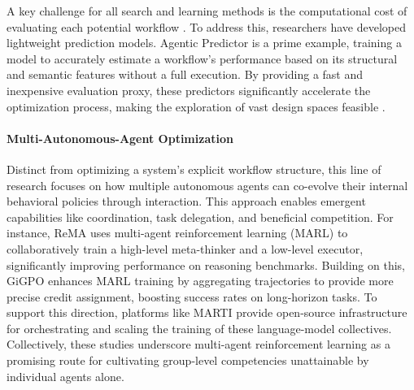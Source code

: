 A key challenge for all search and learning methods is the computational cost of evaluating each potential workflow \citep{shang2025agentsquare}. To address this, researchers have developed lightweight prediction models. Agentic Predictor \citep{trirat2025agentic} is a prime example, training a model to accurately estimate a workflow's performance based on its structural and semantic features without a full execution. By providing a fast and inexpensive evaluation proxy, these predictors significantly accelerate the optimization process, making the exploration of vast design spaces feasible \citep{zhang2025gnns}.


\paragraph{Multi-Autonomous-Agent Optimization}
Distinct from optimizing a system's explicit workflow structure, this line of research focuses on how multiple autonomous agents can co-evolve their internal behavioral policies through interaction. This approach enables emergent capabilities like coordination, task delegation, and beneficial competition. For instance, ReMA \citep{wan2025remalearningmetathinkllms} uses multi-agent reinforcement learning (MARL) to collaboratively train a high-level meta-thinker and a low-level executor, significantly improving performance on reasoning benchmarks. Building on this, GiGPO \citep{feng2025groupingrouppolicyoptimizationllm} enhances MARL training by aggregating trajectories to provide more precise credit assignment, boosting success rates on long-horizon tasks. To support this direction, platforms like MARTI \citep{liao2025marftmultiagentreinforcementfinetuning} provide open-source infrastructure for orchestrating and scaling the training of these language-model collectives. Collectively, these studies underscore multi-agent reinforcement learning as a promising route for cultivating group-level competencies unattainable by individual agents alone.


